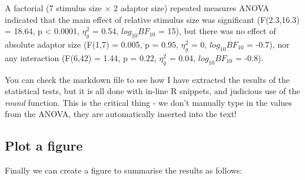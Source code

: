 \documentclass[
]{article}
\begin{document}
A factorial (7 stimulus size \(\times\) 2 adaptor size) repeated measures ANOVA indicated that the main effect of relative stimulus size was significant (F(2.3,16.3) = 18.64, p \textless{} 0.0001, \(\eta^2_g\) = 0.54, \(log_{10}BF_{10}\) = 15), but there was no effect of absolute adaptor size (F(1,7) = 0.005, p = 0.95, \(\eta^2_g\) = 0, \(log_{10}BF_{10}\) = -0.7), nor any interaction (F(6,42) = 1.44, p = 0.22, \(\eta^2_g\) = 0.04, \(log_{10}BF_{10}\) = -0.8).

You can check the markdown file to see how I have extracted the results of the statistical tests, but it is all done with in-line R snippets, and judicious use of the \emph{round} function. This is the critical thing - we don't manually type in the values from the ANOVA, they are automatically inserted into the text!

\hypertarget{plot-a-figure}{%
\subsection{Plot a figure}\label{plot-a-figure}}

Finally we can create a figure to summarise the results as follows:
\end{document}
